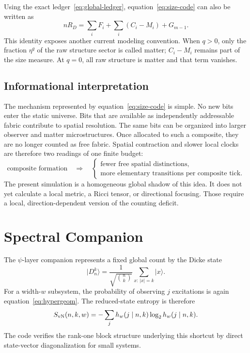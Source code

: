 \documentclass[11pt]{article}
\begin{document}
Using the exact ledger~\eqref{eq:global-ledger}, equation~\eqref{eq:size-code}
can also be written as
\begin{equation}
 nR_D
 =\sum_iF_i+\sum_i(C_i-M_i)+G_{m-1}.
 \label{eq:size-ledger}
\end{equation}
This identity exposes another current modeling convention.  When $q>0$,
only the fraction $\eta^q$ of the raw structure sector is called matter;
$C_i-M_i$ remains part of the size measure.  At $q=0$, all raw structure is
matter and that term vanishes.

\subsection{Informational interpretation}

The mechanism represented by equation~\eqref{eq:size-code} is simple.  No
new bits enter the static universe.  Bits that are available as independently
addressable fabric contribute to spatial resolution.  The same bits can be
organized into larger observer and matter microstructures.  Once allocated
to such a composite, they are no longer counted as free fabric.  Spatial
contraction and slower local clocks are therefore two readings of one finite
budget:
\begin{equation}
 \text{composite formation}
 \quad\Longrightarrow\quad
 \begin{cases}
  \text{fewer free spatial distinctions},\\
  \text{more elementary transitions per composite tick}.
 \end{cases}
 \label{eq:curvature-intuition}
\end{equation}
The present simulation is a homogeneous global shadow of this idea.  It does
not yet calculate a local metric, a Ricci tensor, or directional focusing.
Those require a local, direction-dependent version of the counting deficit.

\section{Spectral Companion}
\label{sec:spectral}

The $\psi$-layer companion represents a fixed global count by the Dicke state
\begin{equation}
 \lvert D_n^k\rangle
 =\frac{1}{\sqrt{\binom nk}}
  \sum_{x:\,|x|=k}\lvert x\rangle.
 \label{eq:dicke}
\end{equation}
For a width-$w$ subsystem, the probability of observing $j$ excitations is
again equation~\eqref{eq:hypergeom}.  The reduced-state entropy is therefore
\begin{equation}
 S_{\rm vN}(n,k,w)
 =-\sum_j h_w(j\mid n,k)\log_2h_w(j\mid n,k).
 \label{eq:svn}
\end{equation}
The code verifies the rank-one block structure underlying this shortcut by
direct state-vector diagonalization for small systems.
\end{document}
